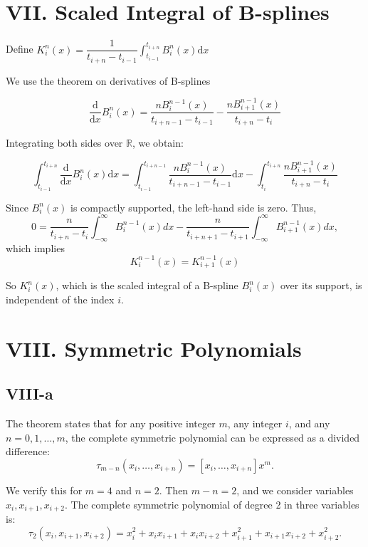 \documentclass[a4paper]{article}
\begin{document}
\section*{VII. Scaled Integral of B-splines}

Define $K_i^n(x) = \dfrac{1}{t_{i+n} - t_{i-1}} \int_{t_{i-1}}^{t_{i+n}} B_i^n(x) \mathrm{d}x$

We use the theorem on derivatives of B-splines

$$\dfrac{\mathrm{d}}{\mathrm{d}x}B_i^n(x) = \dfrac{nB_i^{n-1}(x)}{t_{i+n-1} - t_{i-1}} - \dfrac{nB_{i+1}^{n-1}(x)}{t_{i+n} - t_{i}}$$

Integrating both sides over $\mathbb{R}$, we obtain:

$$\int_{t_{i-1}}^{t_{i+n}}\dfrac{\mathrm{d}}{\mathrm{d}x}B_i^n(x) \mathrm{d}x = \int_{t_{i-1}}^{t_{i+n-1}} \dfrac{nB_i^{n-1}(x)}{t_{i+n-1} - t_{i-1}} \mathrm{d}x - \int_{t_{i}}^{t_{i+n}} \dfrac{nB_{i+1}^{n-1}(x)}{t_{i+n} - t_{i}}$$

Since \( B_i^n(x) \) is compactly supported, the left-hand side is zero. Thus,
\[
0 = \frac{n}{t_{i+n} - t_i} \int_{-\infty}^{\infty} B_i^{n-1}(x)  dx - \frac{n}{t_{i+n+1} - t_{i+1}} \int_{-\infty}^{\infty} B_{i+1}^{n-1}(x)  dx,
\]
which implies
\[
K_i^{n-1}(x) = K_{i+1}^{n-1}(x)
\]

So $K_i^n(x)$, which is the scaled integral of a B-spline $B_i^n(x)$ over its support, is independent of the index $i$.

\section*{VIII. Symmetric Polynomials}

\subsection*{VIII-a}

The theorem states that for any positive integer \( m \), any integer \( i \), and any \( n = 0, 1, \ldots, m \), the complete symmetric polynomial can be expressed as a divided difference:
\[
\tau_{m-n}(x_i, \ldots, x_{i+n}) = [x_i, \ldots, x_{i+n}] x^m.
\]

We verify this for \( m = 4 \) and \( n = 2 \). Then \( m - n = 2 \), and we consider variables \( x_i, x_{i+1}, x_{i+2} \). The complete symmetric polynomial of degree 2 in three variables is:
\[
\tau_2(x_i, x_{i+1}, x_{i+2}) = x_i^2 + x_i x_{i+1} + x_i x_{i+2} + x_{i+1}^2 + x_{i+1} x_{i+2} + x_{i+2}^2.
\]
\end{document}
